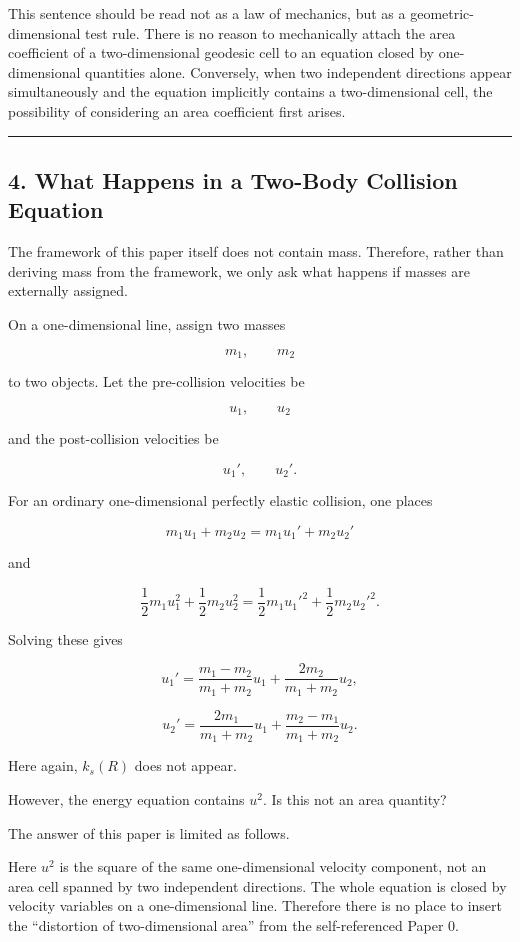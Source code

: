 \documentclass[
]{ltjsarticle}
\begin{document}
This sentence should be read not as a law of mechanics, but as a
geometric-dimensional test rule. There is no reason to mechanically
attach the area coefficient of a two-dimensional geodesic cell to an
equation closed by one-dimensional quantities alone. Conversely, when
two independent directions appear simultaneously and the equation
implicitly contains a two-dimensional cell, the possibility of
considering an area coefficient first arises.

\begin{center}\rule{0.5\linewidth}{0.5pt}\end{center}

\subsection{4. What Happens in a Two-Body Collision
Equation}\label{what-happens-in-a-two-body-collision-equation}

The framework of this paper itself does not contain mass. Therefore,
rather than deriving mass from the framework, we only ask what happens
if masses are externally assigned.

On a one-dimensional line, assign two masses

\[
m_1,\qquad m_2
\]

to two objects. Let the pre-collision velocities be

\[
u_1,\qquad u_2
\]

and the post-collision velocities be

\[
u_1',\qquad u_2'.
\]

For an ordinary one-dimensional perfectly elastic collision, one places

\[
m_1u_1+m_2u_2=m_1u_1'+m_2u_2'
\]

and

\[
\frac{1}{2}m_1u_1^2+\frac{1}{2}m_2u_2^2
=
\frac{1}{2}m_1{u_1'}^2+\frac{1}{2}m_2{u_2'}^2.
\]

Solving these gives

\[
u_1'
=
\frac{m_1-m_2}{m_1+m_2}u_1
+
\frac{2m_2}{m_1+m_2}u_2,
\]

\[
u_2'
=
\frac{2m_1}{m_1+m_2}u_1
+
\frac{m_2-m_1}{m_1+m_2}u_2.
\]

Here again, \(k_s(R)\) does not appear.

However, the energy equation contains \(u^2\). Is this not an area
quantity?

The answer of this paper is limited as follows.

Here \(u^2\) is the square of the same one-dimensional velocity
component, not an area cell spanned by two independent directions. The
whole equation is closed by velocity variables on a one-dimensional
line. Therefore there is no place to insert the ``distortion of
two-dimensional area'' from the self-referenced Paper 0.
\end{document}

